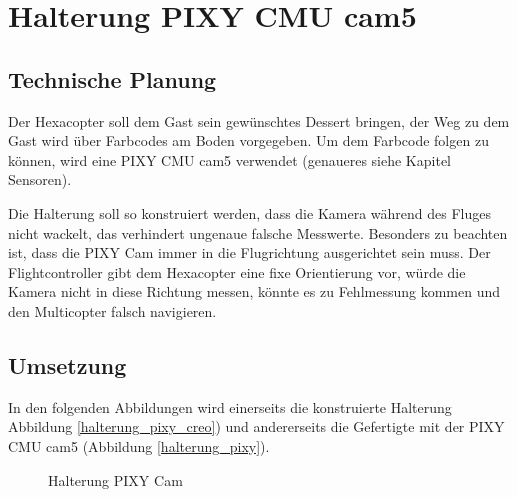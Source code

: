 			\newpage

\section{Halterung PIXY CMU cam5}

	\subsection{Technische Planung}

	Der Hexacopter soll dem Gast sein gewünschtes Dessert bringen, der Weg zu dem Gast wird über Farbcodes am Boden vorgegeben.
	Um dem Farbcode folgen zu können, wird eine PIXY CMU cam5 verwendet (genaueres siehe Kapitel Sensoren).

	Die Halterung soll so konstruiert werden, dass die Kamera während des Fluges nicht wackelt, das verhindert ungenaue \bzw falsche Messwerte.
	Besonders zu beachten ist, dass die PIXY Cam immer in die Flugrichtung ausgerichtet sein muss.
	Der Flightcontroller gibt dem Hexacopter eine fixe Orientierung vor, würde die Kamera nicht in diese Richtung messen, könnte es zu Fehlmessung kommen und den Multicopter falsch navigieren.

	\subsection{Umsetzung}

	In den folgenden Abbildungen wird einerseits die konstruierte Halterung Abbildung \ref{halterung_pixy_creo})
	und andererseits die Gefertigte  mit der PIXY CMU cam5 (Abbildung \ref{halterung_pixy}).

			\begin{figure}[thb]
				\begin{centering}
				\par\end{centering}
				\caption{Halterung PIXY Cam}
				\label{Halterung_PIXY}
			\end{figure}

